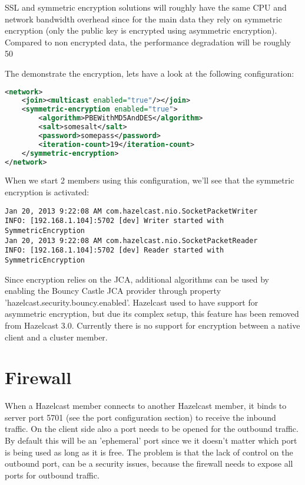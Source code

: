 SSL and symmetric encryption solutions will roughly have the same CPU and network bandwidth overhead since for the main data  they rely on symmetric encryption (only the public key is encrypted using asymmetric encryption). Compared to non encrypted data, the performance degradation will be roughly 50%

The demonstrate the encryption, lets have a look at the following configuration:
\begin{lstlisting}[language=xml]
<network>
    <join><multicast enabled="true"/></join>
    <symmetric-encryption enabled="true">
        <algorithm>PBEWithMD5AndDES</algorithm>
        <salt>somesalt</salt>
        <password>somepass</password>
        <iteration-count>19</iteration-count>
    </symmetric-encryption>
</network>
\end{lstlisting}
When we start 2 members using this configuration, we'll see that the symmetric encryption is activated:
\begin{lstlisting}
Jan 20, 2013 9:22:08 AM com.hazelcast.nio.SocketPacketWriter
INFO: [192.168.1.104]:5702 [dev] Writer started with SymmetricEncryption
Jan 20, 2013 9:22:08 AM com.hazelcast.nio.SocketPacketReader
INFO: [192.168.1.104]:5702 [dev] Reader started with SymmetricEncryption
\end{lstlisting}

Since encryption relies on the JCA, additional algorithms can be used by enabling the Bouncy Castle JCA provider through property 'hazelcast.security.bouncy.enabled'. Hazelcast used to have support for asymmetric encryption, but due its complex setup, this feature has been removed from Hazelcast 3.0. Currently there is no support for encryption between a native client and a cluster member.

\section{Firewall}
When a Hazelcast member connects to another Hazelcast member, it binds to server port 5701 (see the port configuration section) to receive the inbound traffic. On the client side also a port needs to be opened for the outbound traffic. By default this will be an 'ephemeral' port since we it doesn't matter which port is being used as long as it is free. The problem is that the lack of control on the outbound port, can be a security issues, because the firewall needs to expose all ports for outbound traffic. 

